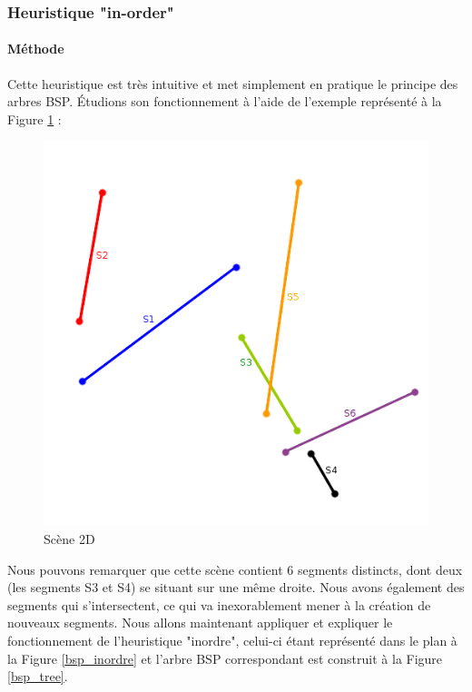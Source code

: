 \documentclass[11pt,a4paper]{article}
\theoremstyle{definition}
\theoremstyle{remark}
\begin{document}
\subsubsection{Heuristique "in-order"}

\paragraph{Méthode}

Cette heuristique est très intuitive et met simplement en pratique le principe des arbres BSP. Étudions son fonctionnement à l'aide de l'exemple représenté à la Figure \ref{scene_inordre} : 

\begin{figure}[!h]
\centering
\includegraphics[scale=0.6]{bsp_ex_1.png}
\caption{Scène 2D}
\label{scene_inordre}
\end{figure}

Nous pouvons remarquer que cette scène contient 6 segments distincts, dont deux (les segments S3 et S4) se situant sur une même droite. Nous avons également des segments qui s'intersectent, ce qui va inexorablement mener à la création de nouveaux segments. Nous allons maintenant appliquer et expliquer le fonctionnement de l'heuristique "inordre", celui-ci étant représenté dans le plan à la Figure \ref{bsp_inordre} et l'arbre BSP correspondant est construit à la Figure \ref{bsp_tree}. \\
\end{document}
